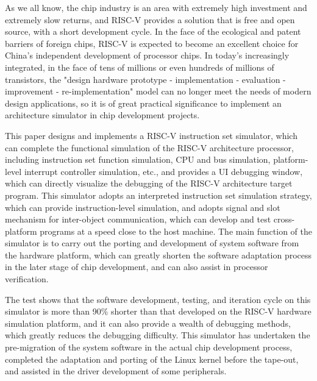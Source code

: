 \begin{abstract*}
  As we all know, the chip industry is an area with extremely high investment and extremely slow returns, and RISC-V provides a solution that is free and open source, with a short development cycle. In the face of the ecological and patent barriers of foreign chips, RISC-V is expected to become an excellent choice for China's independent development of processor chips. In today's increasingly integrated, in the face of tens of millions or even hundreds of millions of transistors, the "design hardware prototype - implementation - evaluation - improvement - re-implementation" model can no longer meet the needs of modern design applications, so it is of great practical significance to implement an architecture simulator in chip development projects.


  This paper designs and implements a RISC-V instruction set simulator, which can complete the functional simulation of the RISC-V architecture processor, including instruction set function simulation, CPU and bus simulation, platform-level interrupt controller simulation, etc., and provides a UI debugging window, which can directly visualize the debugging of the RISC-V architecture target program. This simulator adopts an interpreted instruction set simulation strategy, which can provide instruction-level simulation, and adopts signal and slot mechanism for inter-object communication, which can develop and test cross-platform programs at a speed close to the host machine. The main function of the simulator is to carry out the porting and development of system software from the hardware platform, which can greatly shorten the software adaptation process in the later stage of chip development, and can also assist in processor verification.

  
  The test shows that the software development, testing, and iteration cycle on this simulator is more than 90\% shorter than that developed on the RISC-V hardware simulation platform, and it can also provide a wealth of debugging methods, which greatly reduces the debugging difficulty. This simulator has undertaken the pre-migration of the system software in the actual chip development process, completed the adaptation and porting of the Linux kernel before the tape-out, and assisted in the driver development of some peripherals.
\end{abstract*}
